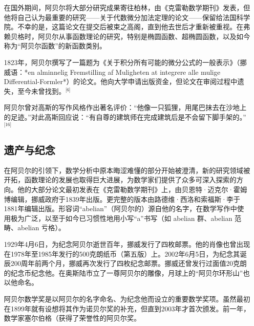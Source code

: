在国外期间，阿贝尔将大部分研究成果寄往柏林，由《克雷勒数学期刊》发表，但他将自己认为最重要的研究——关于代数微分加法定理的论文——保留给法国科学院。不幸的是，这篇论文在提交后被束之高阁，直到他去世后才重新被重视。在弗赖贝格时，阿贝尔从事函数理论的研究，特别是椭圆函数、超椭圆函数，以及如今称为“阿贝尔函数”的新函数类别。

1823年，阿贝尔撰写了一篇题为《关于积分所有可能的微分公式的一般表示》（挪威语：*en alminnelig Fremstilling af Muligheten at integrere alle mulige Differential-Formler*）的论文。他向大学申请出版资金，但论文在审阅过程中遗失，至今未曾找到。\(^\text{[6]}\)

阿贝尔曾对高斯的写作风格作出著名评价：“他像一只狐狸，用尾巴抹去在沙地上的足迹。”对此高斯回应说：“有自尊的建筑师在完成建筑后是不会留下脚手架的。”\(^\text{[16]}\)
\subsection{遗产与纪念}
在阿贝尔的引领下，数学分析中原本晦涩难懂的部分开始被澄清，新的研究领域被开拓，函数理论的发展也取得巨大进展，为数学家们提供了众多可深入探索的方向。他的大部分论文最初发表在《克雷勒数学期刊》上，由贝恩特·迈克尔·霍姆博编辑，挪威政府于1839年出版。更完整的版本由路德维·西洛和索福斯·李于1881年编辑出版。形容词“abelian”（阿贝尔的）源自他的名字，在数学写作中使用极为广泛，以至于如今已习惯性地用小写“a”书写（如 abelian 群、abelian 范畴、abelian 亏格）。

1929年4月6日，为纪念阿贝尔逝世百年，挪威发行了四枚邮票。他的肖像也曾出现在1978年至1985年发行的500克朗纸币（第五版）上。2002年6月5日，为纪念其诞辰200周年前两个月，挪威再次发行了四枚纪念邮票。挪威还曾发行过面值20克朗的纪念币纪念他。在奥斯陆市立了一尊阿贝尔的雕像，月球上的“阿贝尔环形山”也以他命名。

阿贝尔数学奖是以阿贝尔的名字命名、为纪念他而设立的重要数学奖项。虽然最初在1899年就有设想将其作为诺贝尔奖的补充，但直到2003年才首次颁发。前一年，数学家塞尔伯格（获得了荣誉性的阿贝尔奖。
